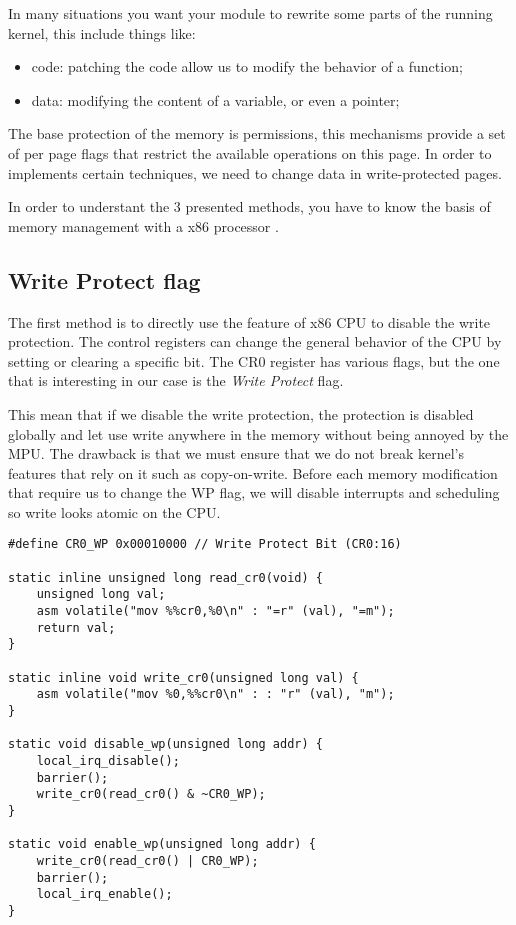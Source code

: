 In many situations you want your module to rewrite some parts of the running
kernel, this include things like:
\begin{itemize}
  \item code: patching the code allow us to modify the behavior of a function;
  \item data: modifying the content of a variable, or even a pointer;
\end{itemize}
The base protection of the memory is permissions, this mechanisms provide a
set of per page flags that restrict the available operations on this page.
In order to implements certain techniques, we need to change data in
write-protected pages.

In order to understant the 3 presented methods, you have to know the basis of
memory management with a x86 processor \cite{kernel_memory}.

\subsection{Write Protect flag}
The first method is to directly use the feature of x86 CPU to disable the
write protection. The control registers can change the general behavior of the
CPU by setting or clearing a specific bit.
The CR0 register has various flags, but the one that is interesting in our case
is the \textit{Write Protect} flag.

This mean that if we disable the write protection, the protection is disabled
globally and let use write anywhere in the memory without being annoyed by
the MPU.
The drawback is that we must ensure that we do not break kernel's features that
rely on it such as copy-on-write. 
Before each memory modification that require us to change the WP flag, we will
disable interrupts and scheduling so write looks atomic on the CPU.
\cite{wp_safe}

\begin{lstlisting}[frame=single]
#define CR0_WP 0x00010000 // Write Protect Bit (CR0:16)

static inline unsigned long read_cr0(void) {
    unsigned long val;
    asm volatile("mov %%cr0,%0\n" : "=r" (val), "=m");
    return val;
}

static inline void write_cr0(unsigned long val) {
    asm volatile("mov %0,%%cr0\n" : : "r" (val), "m");
}

static void disable_wp(unsigned long addr) {
    local_irq_disable();
    barrier();
    write_cr0(read_cr0() & ~CR0_WP);
}

static void enable_wp(unsigned long addr) {
    write_cr0(read_cr0() | CR0_WP);
    barrier();
    local_irq_enable();
}
\end{lstlisting}

